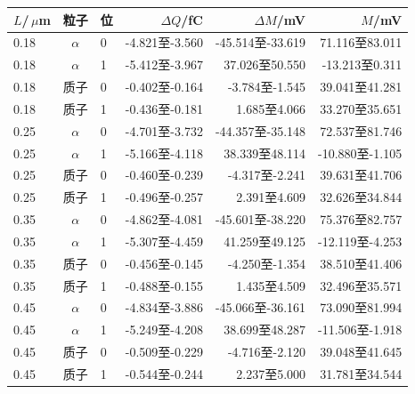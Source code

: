 \begin{tabular}{lclrrr}
\toprule
$L$/\,$\mu$m & 粒子 & 位 & $\Delta Q$/fC & $\Delta M$/mV & $M$/mV\\
\midrule
0.18 & $\alpha$ & 0 & -4.821至-3.560 & -45.514至-33.619 & 71.116至83.011\\
0.18 & $\alpha$ & 1 & -5.412至-3.967 & 37.026至50.550 & -13.213至0.311\\
0.18 & 质子 & 0 & -0.402至-0.164 & -3.784至-1.545 & 39.041至41.281\\
0.18 & 质子 & 1 & -0.436至-0.181 & 1.685至4.066 & 33.270至35.651\\
0.25 & $\alpha$ & 0 & -4.701至-3.732 & -44.357至-35.148 & 72.537至81.746\\
0.25 & $\alpha$ & 1 & -5.166至-4.118 & 38.339至48.114 & -10.880至-1.105\\
0.25 & 质子 & 0 & -0.460至-0.239 & -4.317至-2.241 & 39.631至41.706\\
0.25 & 质子 & 1 & -0.496至-0.257 & 2.391至4.609 & 32.626至34.844\\
0.35 & $\alpha$ & 0 & -4.862至-4.081 & -45.601至-38.220 & 75.376至82.757\\
0.35 & $\alpha$ & 1 & -5.307至-4.459 & 41.259至49.125 & -12.119至-4.253\\
0.35 & 质子 & 0 & -0.456至-0.145 & -4.250至-1.354 & 38.510至41.406\\
0.35 & 质子 & 1 & -0.488至-0.155 & 1.435至4.509 & 32.496至35.571\\
0.45 & $\alpha$ & 0 & -4.834至-3.886 & -45.066至-36.161 & 73.090至81.994\\
0.45 & $\alpha$ & 1 & -5.249至-4.208 & 38.699至48.287 & -11.506至-1.918\\
0.45 & 质子 & 0 & -0.509至-0.229 & -4.716至-2.120 & 39.048至41.645\\
0.45 & 质子 & 1 & -0.544至-0.244 & 2.237至5.000 & 31.781至34.544\\
\bottomrule
\end{tabular}
